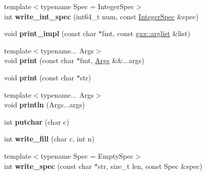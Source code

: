 \begin{DoxyCompactItemize}
\item 
{\footnotesize template$<$typename Spec  = Integer\+Spec$>$ }\\int {\bfseries write\+\_\+int\+\_\+spec} (int64\+\_\+t num, const \hyperlink{classgxx_1_1io_1_1IntegerSpec}{Integer\+Spec} \&spec)\hypertarget{classgxx_1_1io_1_1format__writer_ad142c2af00de5de8420250bedc2ae445}{}\label{classgxx_1_1io_1_1format__writer_ad142c2af00de5de8420250bedc2ae445}

\item 
void {\bfseries print\+\_\+impl} (const char $\ast$fmt, const \hyperlink{classgxx_1_1arglist}{gxx\+::arglist} \&list)\hypertarget{classgxx_1_1io_1_1format__writer_a01a3431e84008b5adfda020e874b1fcb}{}\label{classgxx_1_1io_1_1format__writer_a01a3431e84008b5adfda020e874b1fcb}

\item 
{\footnotesize template$<$typename... Args$>$ }\\void {\bfseries print} (const char $\ast$fmt, \hyperlink{structArgs}{Args} \&\&...args)\hypertarget{classgxx_1_1io_1_1format__writer_a8e74d35d303875e1b1c5f2cb0d768a17}{}\label{classgxx_1_1io_1_1format__writer_a8e74d35d303875e1b1c5f2cb0d768a17}

\item 
void {\bfseries print} (const char $\ast$str)\hypertarget{classgxx_1_1io_1_1format__writer_a400643ef00c00601f672569d73882b71}{}\label{classgxx_1_1io_1_1format__writer_a400643ef00c00601f672569d73882b71}

\item 
{\footnotesize template$<$typename... Args$>$ }\\void {\bfseries println} (Args...\+args)\hypertarget{classgxx_1_1io_1_1format__writer_abc83ba815281c94ec2a5c9cd9550de3b}{}\label{classgxx_1_1io_1_1format__writer_abc83ba815281c94ec2a5c9cd9550de3b}

\item 
int {\bfseries putchar} (char c)\hypertarget{classgxx_1_1io_1_1format__writer_a4e4b84faa244ee84f84f9c0bf8107912}{}\label{classgxx_1_1io_1_1format__writer_a4e4b84faa244ee84f84f9c0bf8107912}

\item 
int {\bfseries write\+\_\+fill} (char c, int n)\hypertarget{classgxx_1_1io_1_1format__writer_a926d75097a61a778c425089993efb5f9}{}\label{classgxx_1_1io_1_1format__writer_a926d75097a61a778c425089993efb5f9}

\item 
{\footnotesize template$<$typename Spec  = Empty\+Spec$>$ }\\int {\bfseries write\+\_\+spec} (const char $\ast$str, size\+\_\+t len, const Spec \&spec)\hypertarget{classgxx_1_1io_1_1format__writer_a0a6b5523382a408f3e8a281f42fd9c1f}{}\label{classgxx_1_1io_1_1format__writer_a0a6b5523382a408f3e8a281f42fd9c1f}


\end{DoxyCompactItemize}
